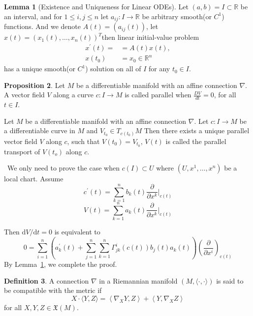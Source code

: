 \documentclass[12pt,a4paper]{book}
\newenvironment{prooff}{{\noindent\it\textcolor{cyan!40!black}{Proof}:}\,}{\par}
\newcommand{\bb}[1]{\mathbb{#1}}
\newcommand{\dd}{\text{d}}
\newcommand{\p}{^{\prime}}
\theoremstyle{definition}
\newtheorem{defn}{Definition}[section]
\newtheorem{lem}[defn]{Lemma}
\newtheorem{prop}[defn]{Proposition}
\begin{document}
\begin{lem}[Existence and Uniqueness for Linear ODEs]
    Let $(a,b)=I \subset \mathbb{R}$ be an interval, and for $1\leq i,j\leq n$ let $a_{ij}: I\rightarrow \mathbb{R}$ be arbitrary smooth(or $C^1$) functions.
    And we denote $A(t)=(a_{ij}(t))$, let $x(t)=(x_1(t),\dots,x_n(t))^T$then
    linear initial-value problem
    $$
        \begin{aligned}
            x\p(t)=           & =A(t) x(t),      \\
            x\left(t_0\right) & =x_0\in \bb{R}^n
        \end{aligned}
    $$
    has a unique smooth(or $C^1$) solution on all of $I$ for any $t_0 \in I$.
    \label{Existence and Uniqueness for Linear ODEs}
\end{lem}
\begin{prop}
    Let $M$ be a differentiable manifold with an affine connection $\nabla$.
    A vector field $V$ along a curve $c: I \rightarrow M$ is called parallel when $\frac{D V}{d t}=0$,
    for all $t \in I$.

    Let $M$ be a differentiable manifold with an affine connection $\nabla$.
    Let $c: I \rightarrow M$ be a differentiable curve in $M$ and $V_{t_0} \in T_{c\left(t_0\right)} M$
    Then there exists a unique parallel vector field $V$ along $c$, such that $V\left(t_0\right)=V_{t_0}$, $V(t)$ is called the parallel transport of $V\left(t_o\right)$ along $c$.
\end{prop}
\begin{prooff}
    We only need to prove the case when $c(I)\subset U$ where $(U,x^1,\dots,x^n)$ be a local chart.
    Assume
    \begin{equation*}
        c\p(t)=\sum_{k=1}^n b_k(t)\frac{\partial}{\partial x^k}\bigg|_{c(t)}
    \end{equation*}
    \begin{equation*}
        V(t)=\sum_{k=1}^n a_k(t)\frac{\partial}{\partial x^k}\bigg|_{c(t)}
    \end{equation*}
\end{prooff}
Then $\dd V/\dd t=0$ is equivalent to
\begin{equation*}
    0=\sum_{i=1}^n\left(a_k\p(t)+\sum_{j=1}^n\sum_{k=1}^n \Gamma_{j k}^i(c(t)) b_j(t)a_k(t)\right)\left(\frac{\partial}{\partial x^i}\right)_{c(t)}
\end{equation*}
By Lemma~\ref{Existence and Uniqueness for Linear ODEs}, we complete the proof.
\begin{defn}
    A connection $\nabla$ in a Riemannian manifold $(M,\langle\cdot, \cdot\rangle)$ is said to be compatible with the metric if
    $$
        X \cdot\langle Y, Z\rangle=\left\langle\nabla_X Y, Z\right\rangle+\left\langle Y, \nabla_X Z\right\rangle
    $$
    for all $X, Y, Z \in \mathfrak{X}(M)$.
\end{defn}
\end{document}
